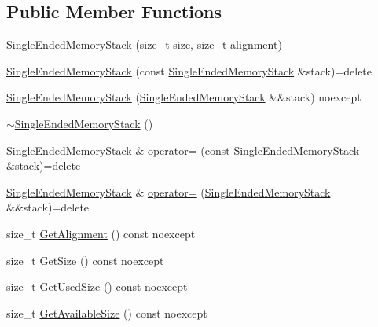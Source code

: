 \subsection*{Public Member Functions}
\begin{DoxyCompactItemize}
\item 
\hyperlink{classmage_1_1_single_ended_memory_stack_ab9555d63b35070aee321cc3839fec3c4}{Single\+Ended\+Memory\+Stack} (size\+\_\+t size, size\+\_\+t alignment)
\item 
\hyperlink{classmage_1_1_single_ended_memory_stack_ae854c4558f0215bf38cb713cbca7fa31}{Single\+Ended\+Memory\+Stack} (const \hyperlink{classmage_1_1_single_ended_memory_stack}{Single\+Ended\+Memory\+Stack} \&stack)=delete
\item 
\hyperlink{classmage_1_1_single_ended_memory_stack_afd6632eac3ada6ea88a69b586f27a4e4}{Single\+Ended\+Memory\+Stack} (\hyperlink{classmage_1_1_single_ended_memory_stack}{Single\+Ended\+Memory\+Stack} \&\&stack) noexcept
\item 
\hyperlink{classmage_1_1_single_ended_memory_stack_adaa82d19a1ef60ca42396bdaaea0c8e6}{$\sim$\+Single\+Ended\+Memory\+Stack} ()
\item 
\hyperlink{classmage_1_1_single_ended_memory_stack}{Single\+Ended\+Memory\+Stack} \& \hyperlink{classmage_1_1_single_ended_memory_stack_a709db7d21cd2db6e98acd7985770468e}{operator=} (const \hyperlink{classmage_1_1_single_ended_memory_stack}{Single\+Ended\+Memory\+Stack} \&stack)=delete
\item 
\hyperlink{classmage_1_1_single_ended_memory_stack}{Single\+Ended\+Memory\+Stack} \& \hyperlink{classmage_1_1_single_ended_memory_stack_a24613dc91ab6577aa57fbd55a4c81023}{operator=} (\hyperlink{classmage_1_1_single_ended_memory_stack}{Single\+Ended\+Memory\+Stack} \&\&stack)=delete
\item 
size\+\_\+t \hyperlink{classmage_1_1_single_ended_memory_stack_a821660699258ecbd007c5909108a911b}{Get\+Alignment} () const noexcept
\item 
size\+\_\+t \hyperlink{classmage_1_1_single_ended_memory_stack_aa1df0adf194d6c2bb6c7597a96c10e61}{Get\+Size} () const noexcept
\item 
size\+\_\+t \hyperlink{classmage_1_1_single_ended_memory_stack_ab2b07a4cf2c9eb9988ad49174e0804ac}{Get\+Used\+Size} () const noexcept
\item 
size\+\_\+t \hyperlink{classmage_1_1_single_ended_memory_stack_a1c3f233b16e8fcb9770b7fe23b83485b}{Get\+Available\+Size} () const noexcept
\item 

\end{DoxyCompactItemize}
